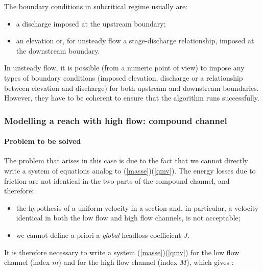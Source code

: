 The boundary conditions in subcritical regime usually are: 
\begin{itemize}
 \item a discharge imposed at the upstream boundary;
 \item an elevation or, for unsteady flow a stage-discharge relationship, imposed at the downstream boundary.
\end{itemize}

\vspace{0.5cm}

In unsteady flow, it is possible (from a numeric point of view) to impose any types of boundary conditions (imposed elevation, discharge or a relationship between elevation and discharge) for both upstream and downstream boundaries. However, they have to be coherent to ensure that the algorithm runs successfully.



\subsubsection{Modelling a reach with high flow: compound channel}

\paragraph{Problem to be solved\\}

\hspace*{1cm}

The problem that arises in this case is due to the fact that we cannot directly write a system of equations analog to (\ref{masse})(\ref{qmv}). The energy losses due to friction are not identical in the two parts of the compound channel, and therefore:
\begin{itemize}
 \item the hypothesis of a uniform velocity in a section and, in particular, a velocity identical in both the low flow and high flow channels, is not acceptable;
 \item we cannot define a priori a \textit{global} headloss coefficient $J$.
\end{itemize}

\vspace{0.5cm}


It is therefore necessary to write a system (\ref{masse})(\ref{qmv}) for the low flow channel (index $m$) and for the high flow channel (index $M$), which gives :


